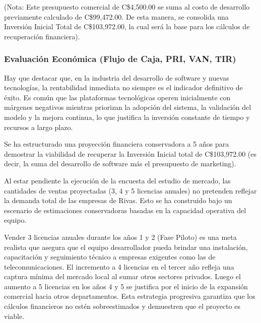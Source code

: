 (Nota: Este presupuesto comercial de C\$4,500.00 se suma al costo de desarrollo previamente calculado de C\$99,472.00. De esta manera, se consolida una Inversión Inicial Total de C\$103,972.00, la cual será la base para los cálculos de recuperación financiera).

\subsubsection{Evaluación Económica (Flujo de Caja, PRI, VAN, TIR)}
Hay que destacar que, en la industria del desarrollo de software y nuevas tecnologías, la rentabilidad inmediata no siempre es el indicador definitivo de éxito. Es común que las plataformas tecnológicas operen inicialmente con márgenes negativos mientras priorizan la adopción del sistema, la validación del modelo y la mejora continua, lo que justifica la inversión constante de tiempo y recursos a largo plazo.

Se ha estructurado una proyección financiera conservadora a 5 años para demostrar la viabilidad de recuperar la Inversión Inicial total de C\$103,972.00 (es decir, la suma del desarrollo de software más el presupuesto de marketing).

Al estar pendiente la ejecución de la encuesta del estudio de mercado, las cantidades de ventas proyectadas (3, 4 y 5 licencias anuales) no pretenden reflejar la demanda total de las empresas de Rivas. Esto se ha construido bajo un escenario de estimaciones conservadoras basadas en la capacidad operativa del equipo.

Vender 3 licencias anuales durante los años 1 y 2 (Fase Piloto) es una meta realista que asegura que el equipo desarrollador pueda brindar una instalación, capacitación y seguimiento técnico a empresas exigentes como las de telecomunicaciones. El incremento a 4 licencias en el tercer año refleja una captura mínima del mercado local al sumar otros sectores privados. Luego el aumento a 5 licencias en los años 4 y 5 se justifica por el inicio de la expansión comercial hacia otros departamentos. Esta estrategia progresiva garantiza que los cálculos financieros no estén sobreestimados y demuestren que el proyecto es viable.

